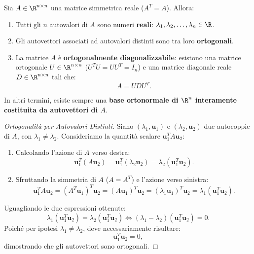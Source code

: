 \begin{theorem}
\label{thm:teorema-spettrale}
Sia $A \in \R^{n \times n}$ una matrice simmetrica reale ($A^T = A$). Allora:
\begin{enumerate}
    \item Tutti gli $n$ autovalori di $A$ sono numeri \textbf{reali}: $\lambda_1, \lambda_2, \dots, \lambda_n \in \R$.
    \item Gli autovettori associati ad autovalori distinti sono tra loro \textbf{ortogonali}.
    \item La matrice $A$ \`e \textbf{ortogonalmente diagonalizzabile}: esistono una matrice ortogonale $U \in \R^{n \times n}$ ($U^T U = U U^T = I_n$) e una matrice diagonale reale $D \in \R^{n \times n}$ tali che:
    \begin{equation}
        A = U D U^T.
    \end{equation}
\end{enumerate}
In altri termini, esiste sempre una \textbf{base ortonormale di $\R^n$ interamente costituita da autovettori di $A$}.
\end{theorem}

\begin{proof}[Ortogonalit\`a per Autovalori Distinti]
Siano $(\lambda_1, \mathbf{u}_1)$ e $(\lambda_2, \mathbf{u}_2)$ due autocoppie di $A$, con $\lambda_1 \neq \lambda_2$. Consideriamo la quantit\`a scalare $\mathbf{u}_1^T A \mathbf{u}_2$:
\begin{enumerate}
    \item Calcolando l'azione di $A$ verso destra:
    \begin{equation}
        \mathbf{u}_1^T (A \mathbf{u}_2) = \mathbf{u}_1^T (\lambda_2 \mathbf{u}_2) = \lambda_2 (\mathbf{u}_1^T \mathbf{u}_2).
    \end{equation}
    \item Sfruttando la simmetria di $A$ ($A = A^T$) e l'azione verso sinistra:
    \begin{equation}
        \mathbf{u}_1^T A \mathbf{u}_2 = (A^T \mathbf{u}_1)^T \mathbf{u}_2 = (A \mathbf{u}_1)^T \mathbf{u}_2 = (\lambda_1 \mathbf{u}_1)^T \mathbf{u}_2 = \lambda_1 (\mathbf{u}_1^T \mathbf{u}_2).
    \end{equation}
\end{enumerate}
Uguagliando le due espressioni ottenute:
\begin{equation}
    \lambda_1 (\mathbf{u}_1^T \mathbf{u}_2) = \lambda_2 (\mathbf{u}_1^T \mathbf{u}_2) \iff (\lambda_1 - \lambda_2) (\mathbf{u}_1^T \mathbf{u}_2) = 0.
\end{equation}
Poich\'e per ipotesi $\lambda_1 \neq \lambda_2$, deve necessariamente risultare:
\begin{equation}
    \mathbf{u}_1^T \mathbf{u}_2 = 0,
\end{equation}
dimostrando che gli autovettori sono ortogonali.
\end{proof}

